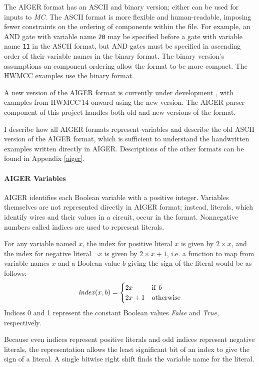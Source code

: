 \documentclass[12pt,a4paper,twoside,openright]{report}
\begin{document}
{The AIGER format has an ASCII and binary version; either
can be used for inputs to \emph{MC}. The ASCII
format is more flexible and human-readable, imposing fewer constraints
on the ordering of components within the file. For example, an
AND gate with variable name {\tt 20} may be specified before a gate with
variable name {\tt 11} in the ASCII format, but AND gates must be specified in
ascending order of their variable names in the binary format.
The binary version's assumptions on component ordering allow the format
to be more compact. The HWMCC examples use the binary format.

A new version of the AIGER format is currently under development \cite{aiger}, with
examples from HWMCC'14 onward using the new version. The AIGER parser component
of this project handles both old and new versions of the format.

I describe how all AIGER formats represent variables
and describe the old ASCII version of the AIGER format, which
is sufficient to understand the handwritten examples written directly
in AIGER. Descriptions of the other formats can be found in Appendix
\ref{aiger}.

\paragraph{AIGER Variables}{
AIGER identifies each Boolean variable with a positive integer.
Variables themselves are not represented directly in AIGER format; instead, literals,
which identify wires and their values in a circuit,
occur in the format. Nonnegative numbers called indices are used to represent literals.

For any variable named $x$, the index for positive literal $x$ is given by
$2 \times x$, and the index for negative literal $\neg x$ is given by
$2 \times x + 1$, i.e. a function to map from variable names $x$ and a Boolean
value $b$ giving the sign of the literal would be as follows:
$${\it index}(x, b) =
\begin{cases}
2x & {\rm if}~b \\
2x + 1 & {\rm otherwise}
\end{cases}$$
Indices 0 and 1 represent the constant Boolean values {\it False}
and {\it True}, respectively.

Because even indices represent positive literals and odd indices
represent negative literals, the representation allows
the least significant bit of an index to give the sign of a literal.
A single bitwise right shift finds the variable name for the literal.

}}
\end{document}
